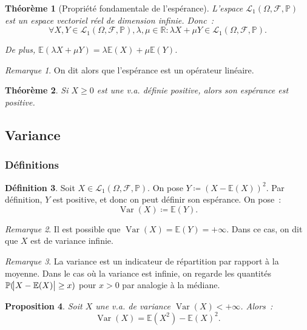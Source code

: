 \documentclass{article}
\newcommand{\E}{\mathbb E}
\renewcommand{\P}{\mathbb P}
\newcommand{\R}{\mathbb R}
\newcommand{\espproba}[3]{\left(#1, #2, #3\right)}
\newcommand{\Ofp}{\espproba \Omega{\mathcal F}\P}
\newcommand{\Lu}{\mathcal L_1\Ofp}
\DeclareMathOperator{\Var}{Var}
\newtheorem{thm}{Théorème}[section]
\newtheorem{prp}[thm]{Proposition}
\theoremstyle{definition}
\newtheorem{déf}[thm]{Définition}
\theoremstyle{remark}
\newtheorem*{rmq}{Remarque}
\begin{document}
		\begin{thm}[Propriété fondamentale de l'espérance] L'espace $\Lu$ est un espace vectoriel réel de dimension infinie. Donc~:
		\[\forall X, Y \in \Lu, \lambda, \mu \in \R : \lambda X + \mu Y \in \Lu.\]

		De plus, $\E(\lambda X + \mu Y) = \lambda \E(X) + \mu \E(Y)$.
		\end{thm}

		\begin{rmq} On dit alors que l'espérance est un opérateur linéaire. \end{rmq}

		\begin{thm} Si $X \geq 0$ est une v.a. définie positive, alors son espérance est positive. \end{thm}

	\subsection{Variance}
		\subsubsection{Définitions}
		\begin{déf} Soit $X \in \Lu$. On pose $Y \coloneqq (X - \E(X))^2$. Par définition, $Y$ est positive, et donc on peut définir son espérance. On pose~:
		\begin{equation}
			\Var(X) \coloneqq \E(Y).
		\end{equation}
		\end{déf}

		\begin{rmq} Il est possible que $\Var(X) = \E(Y) = +\infty$. Dans ce cas, on dit que $X$ est de variance infinie. \end{rmq}

		\begin{rmq} La variance est un indicateur de répartition par rapport à la moyenne. Dans le cas où la variance est infinie, on regarde les quantités
		$\P(\abs{X - \E(X)} \geq x)$ pour $x > 0$ par analogie à la médiane. \end{rmq}

		\begin{prp}\label{var=e-e} Soit $X$ une v.a. de variance $\Var(X) < +\infty$. Alors~:
		\begin{equation}\label{eq:var=e-e}
			\Var(X) = \E(X^2) - \E(X)^2.
		\end{equation}
		\end{prp}
\end{document}
